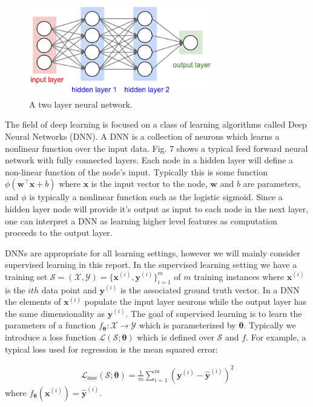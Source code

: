 \documentclass[11pt]{article}
\begin{document}
\begin{figure}
	\begin{center}
		\includegraphics[width=8cm, height=4cm]{dnn}
	\end{center}
	\caption{A two layer neural network.}
\end{figure}
The field of deep learning is focused on a class of learning algorithms called Deep Neural Networks (DNN).  A DNN is a collection of neurons which learns a nonlinear function over the input data.  Fig. 7 shows a typical feed forward neural network with fully connected layers.  Each node in a hidden layer will define a non-linear function of the node's input.  Typically this is some function $\phi(\textbf{w}^{\top} \textbf{x} + b)$ where $\textbf{x}$ is the input vector to the node, $\textbf{w}$ and $b$ are parameters, and $\phi$ is typically a nonlinear function such as the logistic sigmoid.  Since a hidden layer node will provide it's output as input to each node in the next layer, one can interpret a DNN as learning higher level features as computation proceeds to the output layer.

DNNs are appropriate for all learning settings, however we will mainly consider supervised learning in this report.  In the supervised learning setting we have a training set $\mathcal{S} = (\mathcal{X}, \mathcal{Y}) = \{ \textbf{x}^{(i)}, \textbf{y}^{(i)} \}_{i = 1}^{m}$ of $m$ training instances where $\textbf{x}^{(i)}$ is the $ith$ data point and $\textbf{y}^{(i)}$ is the associated ground truth vector.  In a DNN the elements of $\textbf{x}^{(i)}$ populate the input layer neurons while the output layer has the same dimensionality as $\textbf{y}^{(i)}$.  The goal of supervised learning is to learn the parameters of a function $ f_{\boldsymbol{\theta}}: \mathcal{X} \rightarrow \mathcal{Y}  $ which is parameterized by $ \boldsymbol{\theta} $.  Typically we introduce a loss function $\mathcal{L}(\mathcal{S} ;\boldsymbol{\theta})$ which is defined over $\mathcal{S}$ and $f$.  For example, a typical loss used for regression is the mean squared error: 

\begin{gather*}
\mathcal{L}_{\text{mse}}(\mathcal{S} ;\boldsymbol{\theta}) = \frac{1}{m} \sum_{i = 1}^{m} (\textbf{y}^{(i)} - \hat{\textbf{y}}^{(i)})^2
\end{gather*}
where $f_{\boldsymbol{\theta}}(\textbf{x}^{(i)}) = \hat{\textbf{y}}^{(i)}$.
\end{document}
